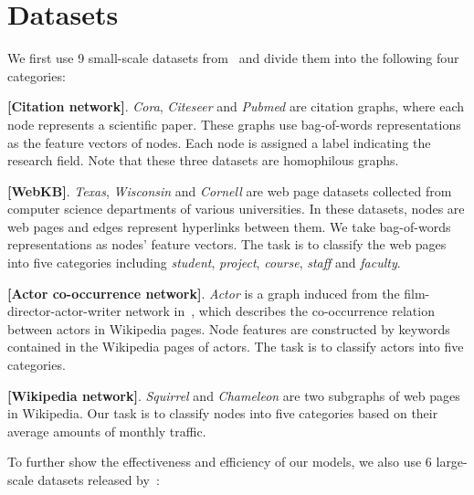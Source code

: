 \documentclass[nohyperref]{article}
\theoremstyle{plain}
\theoremstyle{definition}
\theoremstyle{remark}
\begin{document}
\section{Datasets}
\label{sec:datasets}
We first use 9 small-scale datasets from~\cite{pei2020geom} 
and divide them into the following four categories:

\noindent{\small}
\textbf{[Citation network]}.
\emph{Cora}, 
\emph{Citeseer} and \emph{Pubmed} are citation graphs,
where each node represents a scientific paper.
These graphs use 
bag-of-words representations as the feature vectors of nodes.
Each node is assigned a label indicating the research field.
Note that these three datasets are homophilous graphs.

\noindent{\small}
\textbf{[WebKB]}.
\emph{Texas}, \emph{Wisconsin} and \emph{Cornell} 
are web page datasets collected 
from computer science departments of various universities.
In these datasets, 
nodes are web pages and 
edges represent hyperlinks between them.
We take bag-of-words representations as nodes' feature vectors.
The task is to classify the web pages into five categories including \emph{student}, \emph{project}, \emph{course}, \emph{staff} and \emph{faculty}.




\noindent{\small}
\textbf{[Actor co-occurrence network]}.
\emph{Actor} is a graph induced from the film-director-actor-writer network in~\cite{tang2009social},
which describes the co-occurrence relation between actors in Wikipedia pages.
Node features are constructed by keywords contained in the Wikipedia pages of actors.
The task is to classify actors into five categories.




\noindent{\small}
\textbf{[Wikipedia network]}.
\emph{Squirrel} and \emph{Chameleon}
are two subgraphs of web pages in Wikipedia.
Our task is to classify nodes into five categories based on their average amounts of monthly traffic.

To further show the effectiveness and efficiency of our models,
we also use 6 large-scale datasets released by~\cite{lim2021large}:
\end{document}
